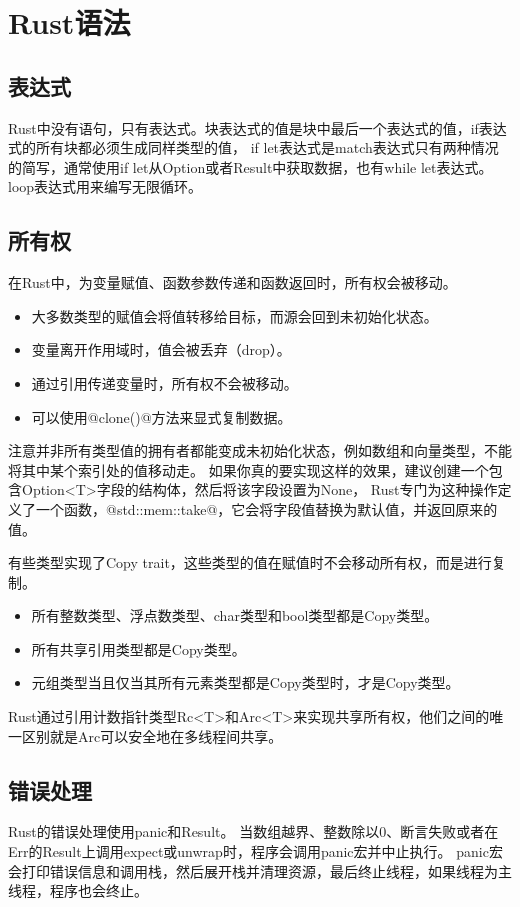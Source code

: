 \section{Rust语法}
\subsection{表达式}
Rust中没有语句，只有表达式。块表达式的值是块中最后一个表达式的值，if表达式的所有块都必须生成同样类型的值，
if let表达式是match表达式只有两种情况的简写，通常使用if let从Option或者Result中获取数据，也有while let表达式。
loop表达式用来编写无限循环。

\subsection{所有权}
在Rust中，为变量赋值、函数参数传递和函数返回时，所有权会被移动。
\begin{itemize}[itemsep=0pt, parsep=0pt]
	\item 大多数类型的赋值会将值转移给目标，而源会回到未初始化状态。
	\item 变量离开作用域时，值会被丢弃（drop）。
	\item 通过引用传递变量时，所有权不会被移动。
	\item 可以使用@clone()@方法来显式复制数据。
\end{itemize}

注意并非所有类型值的拥有者都能变成未初始化状态，例如数组和向量类型，不能将其中某个索引处的值移动走。
如果你真的要实现这样的效果，建议创建一个包含Option<T>字段的结构体，然后将该字段设置为None，
Rust专门为这种操作定义了一个函数，@std::mem::take@，它会将字段值替换为默认值，并返回原来的值。

有些类型实现了Copy trait，这些类型的值在赋值时不会移动所有权，而是进行复制。
\begin{itemize}[itemsep=0pt, parsep=0pt]
	\item 所有整数类型、浮点数类型、char类型和bool类型都是Copy类型。
	\item 所有共享引用类型都是Copy类型。
	\item 元组类型当且仅当其所有元素类型都是Copy类型时，才是Copy类型。
\end{itemize}

Rust通过引用计数指针类型Rc<T>和Arc<T>来实现共享所有权，他们之间的唯一区别就是Arc可以安全地在多线程间共享。

\subsection{错误处理}
Rust的错误处理使用panic和Result。
当数组越界、整数除以0、断言失败或者在Err的Result上调用expect或unwrap时，程序会调用panic宏并中止执行。
panic宏会打印错误信息和调用栈，然后展开栈并清理资源，最后终止线程，如果线程为主线程，程序也会终止。

